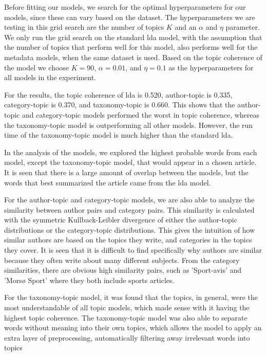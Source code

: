 Before fitting our models, we search for the optimal hyperparameters for our models, since these can vary based on the dataset.
The hyperparameters we are testing in this grid search are the number of topics $K$ and an $\alpha$ and $\eta$ parameter.
We only run the grid search on the standard \gls{lda} model, with the assumption that the number of topics that perform well for this model, also performs well for the metadata models, when the same dataset is used.
Based on the topic coherence of the model we choose $K = 90$, $\alpha = 0.01$, and $\eta = 0.1$ as the hyperparameters for all models in the experiment.

For the results, the topic coherence of \gls{lda} is 0.520, author-topic is 0.335, category-topic is 0.370, and taxonomy-topic is 0.660.
This shows that the author-topic and category-topic models performed the worst in topic coherence, whereas the taxonomy-topic model is outperforming all other models.
However, the run time of the taxonomy-topic model is much higher than the standard \gls{lda}.

In the analysis of the models, we explored the highest probable words from each model, except the taxonomy-topic model, that would appear in a chosen article.
It is seen that there is a large amount of overlap between the models, but the words that best summarized the article came from the \gls{lda} model.

For the author-topic and category-topic models, we are also able to analyze the similarity between author pairs and category pairs.
This similarity is calculated with the symmetric Kullback-Leibler divergence of either the author-topic distributions or the category-topic distributions.
This gives the intuition of how similar authors are based on the topics they write, and categories in the topics they cover.
It is seen that it is difficult to find specifically why authors are similar because they often write about many different subjects.
From the category similarities, there are obvious high similarity pairs, such as 'Sport-avis' and 'Morsø Sport' where they both include sports articles.

For the taxonomy-topic model, it was found that the topics, in general, were the most understandable of all topic models, which made sense with it having the highest topic coherence.
The taxonomy-topic model was also able to separate words without meaning into their own topics, which allows the model to apply an extra layer of preprocessing, automatically filtering away irrelevant words into topics


